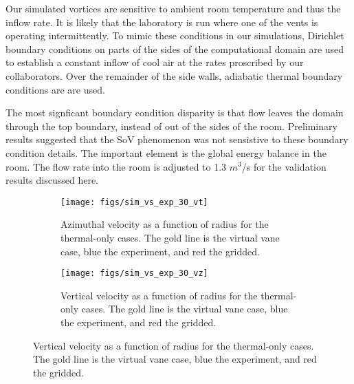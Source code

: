 Our simulated vortices are sensitive to ambient room temperature and thus 
the inflow rate. It is likely that the laboratory is run where one of
the vents is operating intermittently. 
To mimic these conditions in our simulations, Dirichlet boundary conditions 
on parts of the sides of the computational domain are used to
establish a constant inflow of cool air at the rates 
proscribed by our collaborators. Over the remainder of the side walls, 
adiabatic thermal boundary conditions are are used. 

The most signficant boundary condition disparity is that
flow leaves the domain through the top boundary, instead of out
of the sides of the room. Preliminary results suggested that the SoV phenomenon 
was not sensistive to these boundary condition details. The important element is the 
global energy balance in the room. The flow rate into the room is adjusted to 
1.3 $m^3$/s for the validation results discussed here. 


\begin{figure}[htb]

 \begin{subfigure}{.5\textwidth}
  \centering
  \texttt{[image: figs/sim\_vs\_exp\_30\_vt]}
  \caption{Azimuthal velocity as a function of radius for the thermal-only cases.
    The gold line is the virtual vane case, blue the experiment, and red the gridded.}
 \end{subfigure}%
 \begin{subfigure}{.5\textwidth}
  \centering
  \texttt{[image: figs/sim\_vs\_exp\_30\_vz]}%
  \caption{Vertical velocity as a function of radius for the thermal-only cases. 
The gold line is the virtual vane case, blue the experiment, and red the gridded. } 
 \end{subfigure}%
  \label{fig:val_lab}  
\end{figure}



